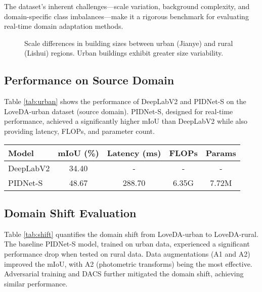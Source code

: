 \documentclass{article}
\begin{document}
\begin{multicols}{2}
		The dataset’s inherent challenges—scale variation, background complexity, and domain-specific class imbalances—make it a rigorous benchmark for evaluating real-time domain adaptation methods.  
		
		\begin{figure}[ht]  
			\begin{center} 

			\caption{Scale differences in building sizes between urban (Jianye) and rural (Lishui) regions. Urban buildings exhibit greater size variability.}  
			\label{fig:scale}  
			\end{center} 
		\end{figure}
		\subsection{Performance on Source Domain}
		Table \ref{tab:urban} shows the performance of DeepLabV2 and PIDNet-S on the LoveDA-urban dataset (source domain). PIDNet-S, designed for real-time performance, achieved a significantly higher mIoU than DeepLabV2 while also providing latency, FLOPs, and parameter count.
		\begin{center} 
			\vspace{2cm}
			
			\label{tab:urban}
			
			\tiny
			\begin{tabular}{|l|c|c|c|c|}
				\hline
				Model & mIoU (\%) & Latency (ms) & FLOPs & Params \\ \hline
				DeepLabV2 & 34.40 & - & - & - \\ \hline
				PIDNet-S & 48.67 & 288.70 & 6.35G & 7.72M \\ \hline
			\end{tabular}
				\vspace{0.2cm}
		\end{center} 
		
		
		
		

		
		\subsection{Domain Shift Evaluation}
		\small
		Table \ref{tab:shift} quantifies the domain shift from LoveDA-urban to LoveDA-rural. The baseline PIDNet-S model, trained on urban data, experienced a significant performance drop when tested on rural data. Data augmentations (A1 and A2) improved the mIoU, with A2 (photometric transforms) being the most effective. Adversarial training and DACS further mitigated the domain shift, achieving similar performance.
		\begin{center}


\end{center}
\end{multicols}
\end{document}
